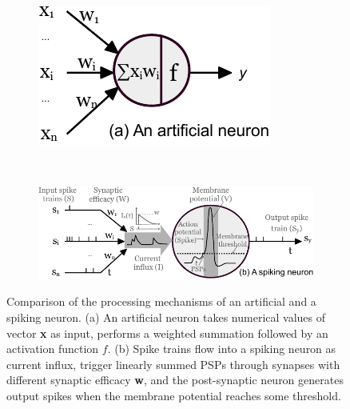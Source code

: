 \documentclass{article}
\begin{document}
	\begin{figure}[tb!]
		\centering
		\begin{subfigure}[t]{0.32\textwidth}
			\includegraphics[width=\textwidth]{pics_iconip/neuron_ann.pdf}
		\end{subfigure}~
		\begin{subfigure}[t]{0.65\textwidth}
			\includegraphics[width=\textwidth]{pics_iconip/neuron_snn.pdf}
		\end{subfigure}
		\caption{Comparison of the processing mechanisms of an artificial and a spiking neuron. (a) An artificial neuron takes numerical values of vector \textbf{x} as input, performs a weighted summation followed by an activation function $f$. (b) Spike trains flow into a spiking neuron as current influx, trigger linearly summed PSPs through synapses with different synaptic efficacy \textbf{w}, and the post-synaptic neuron generates output spikes when the membrane potential reaches some threshold.}
		\label{Fig:compare_as}
	\end{figure}
	
\end{document}
